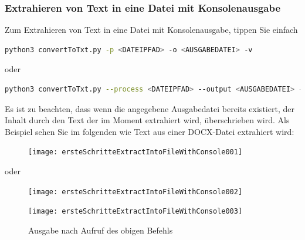\documentclass[12pt]{scrartcl}
\begin{document}
\subsubsection{Extrahieren von Text in eine Datei mit Konsolenausgabe}
\label{sec:first-steps-extraction-file-with}
Zum Extrahieren von Text in eine Datei mit Konsolenausgabe, tippen Sie einfach 
\begin{lstlisting}[language=bash]
python3 convertToTxt.py -p <DATEIPFAD> -o <AUSGABEDATEI> -v
\end{lstlisting}
\begin{center}
oder
\end{center}
\begin{lstlisting}[language=bash] 
python3 convertToTxt.py --process <DATEIPFAD> --output <AUSGABEDATEI> -v
\end{lstlisting}
Es ist zu beachten, dass wenn die angegebene Ausgabedatei bereits existiert, der Inhalt durch den Text der im Moment extrahiert wird, überschrieben wird.
 Als Beispiel sehen Sie im folgenden wie Text aus einer DOCX-Datei extrahiert wird:
\begin{figure}[htbp]
\texttt{[image: ersteSchritteExtractIntoFileWithConsole001]}\par\vspace{0.25cm}
\label{fig:ersteSchritteExtractIntoFileWithConsole001}
\end{figure}
\begin{center}
oder
\end{center}
\begin{figure}[htbp]
\texttt{[image: ersteSchritteExtractIntoFileWithConsole002]}\par

\vspace{0.25cm}
\label{fig:ersteSchritteExtractIntoFileWithConsole002}
\end{figure}
\begin{figure}[htbp]
\centering
\texttt{[image: ersteSchritteExtractIntoFileWithConsole003]}\par\vspace{0.25cm}
\caption{Ausgabe nach Aufruf des obigen Befehls}
\end{figure}
\newpage
\end{document}
